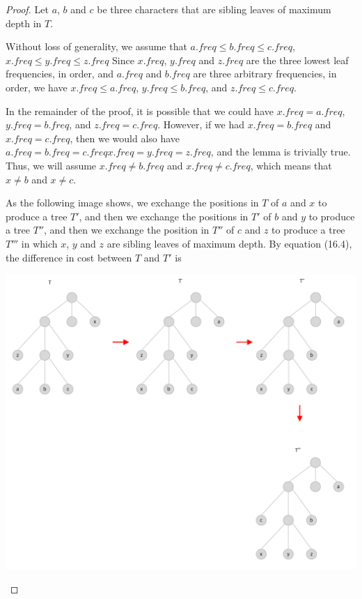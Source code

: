 \documentclass[12pt]{article}
\begin{document}
\begin{enumerate}[1.]
\begin{mdframed}
\begin{itemize}
            \bigskip

            \begin{proof}
            Let $a$, $b$ and $c$ be three characters that are sibling leaves of maximum
            depth in $T$.

            \bigskip

            Without loss of generality, we assume that $a.freq \leq b.freq \leq c.freq$, $x.freq \leq y.freq \leq z.freq$
            Since $x.freq$, $y.freq$ and $z.freq$ are the three lowest leaf frequencies, in order,
            and $a.freq$ and $b.freq$ are three arbitrary frequencies, in order, we have $x.freq \leq a.freq$,
            $y.freq \leq b.freq$, and $z.freq \leq c.freq$.

            \bigskip

            In the remainder of the proof, it is possible that we could have $x.freq = a.freq$,
            $y.freq = b.freq$, and $z.freq = c.freq$. However, if we had $x.freq = b.freq$ and $x.freq = c.freq$,
            then we would also have $a.freq = b.freq = c.freq x.freq = y.freq = z.freq$,
            and the lemma is trivially true. Thus, we will assume $x.freq \neq b.freq$ and $x.freq \neq c.freq$,
            which means that $x \neq b$ and $x \neq c$.

            \bigskip

            As the following image shows, we exchange the positions in $T$ of $a$ and $x$
            to produce a tree $T'$, and then we exchange the positions in $T'$ of $b$ and $y$
            to produce a tree $T''$, and then we exchange the position in $T''$ of $c$ and $z$
            to produce a tree $T'''$ in which  $x$, $y$ and $z$ are sibling leaves of maximum depth.
            By equation (16.4), the difference in cost between $T$ and $T'$ is

            \begin{center}
            \includegraphics[width=\linewidth]{images/worksheet_2_solution_21.png}
            \end{center}


\end{proof}
\end{itemize}
\end{mdframed}
\end{enumerate}
\end{document}
